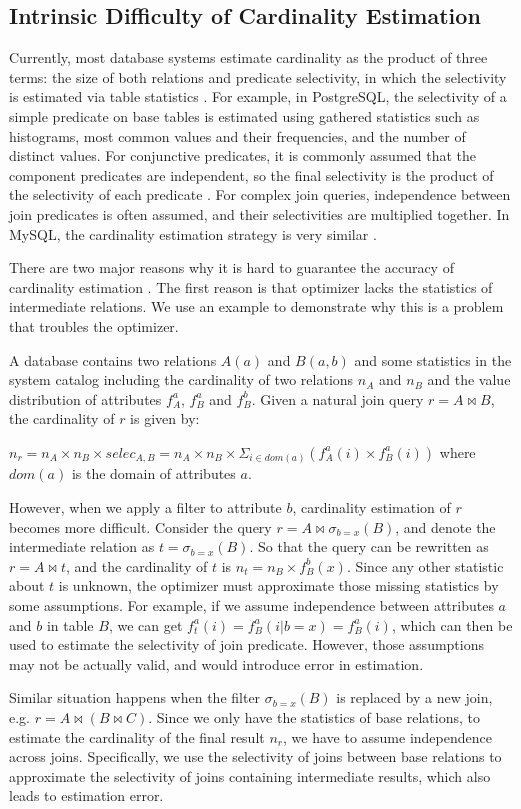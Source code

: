 \subsection{Intrinsic Difficulty of Cardinality Estimation} \label{S21}
    Currently, most database systems estimate cardinality as the product of three terms: the size of both relations and predicate selectivity, in which the selectivity is estimated via table statistics \cite{book1}. For example, in PostgreSQL, the selectivity of a simple predicate on base tables is estimated using gathered statistics such as histograms, most common values and their frequencies, and the number of distinct values. For conjunctive predicates, it is commonly assumed that the component predicates are independent, so the final selectivity is the product of the selectivity of each predicate \cite{JOB}. For complex join queries, independence between join predicates is often assumed, and their selectivities are multiplied together. In MySQL, the cardinality estimation strategy is very similar \cite{manual1}.\par
    There are two major reasons why it is hard to guarantee the accuracy of cardinality estimation \cite{Reopt}. The first reason is that optimizer lacks the statistics of intermediate relations. We use an example to demonstrate why this is a problem that troubles the optimizer.
    \begin{Example}
        A database contains two relations $A(a)$ and $B(a, b)$ and some statistics in the system catalog including the cardinality of two relations $n_A$ and $n_B$ and the value distribution of attributes $f_A^a$, $f_B^a$ and $f_B^b$. Given a natural join query $r=A \bowtie B$, the cardinality of $r$ is given by:\par
        $n_r=n_A \times n_B \times selec_{A,B}=n_A \times n_B \times \Sigma_{i \in dom(a)}(f_A^a(i) \times f_B^a(i))$
        where $dom(a)$ is the domain of attributes $a$.\par
        However, when we apply a filter to attribute $b$, cardinality estimation of $r$ becomes more difficult. Consider the query $r=A \bowtie \sigma_{b=x}(B)$, and denote the intermediate relation as $t=\sigma_{b=x}(B)$. So that the query can be rewritten as $r=A \bowtie t$, and the cardinality of $t$ is $n_t=n_B \times f_B^b(x)$. Since any other statistic about $t$ is unknown, the optimizer must approximate those missing statistics by some assumptions. For example, if we assume independence between attributes $a$ and $b$ in table $B$, we can get $f_t^a(i) = f_B^a(i|b=x) = f_B^a(i)$, which can then be used to estimate the selectivity of join predicate. However, those assumptions may not be actually valid, and would introduce error in estimation.\par
        Similar situation happens when the filter $\sigma_{b=x}(B)$ is replaced by a new join, e.g. $r=A \bowtie (B \bowtie C)$. Since we only have the statistics of base relations, to estimate the cardinality of the final result $n_r$, we have to assume independence across joins. Specifically, we use the selectivity of joins between base relations to approximate the selectivity of joins containing intermediate results, which also leads to estimation error.
    \end{Example}
